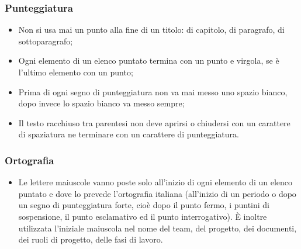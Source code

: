\subsubsection{Punteggiatura}
\begin{itemize}
\item Non si usa mai un punto alla fine di un titolo: di capitolo, di paragrafo, di sottoparagrafo;

\item Ogni elemento di un elenco puntato termina con un punto e virgola, se è l'ultimo elemento con un punto;

\item Prima di ogni segno di punteggiatura non va mai messo uno spazio bianco, dopo invece lo spazio bianco va messo sempre;

\item Il testo racchiuso tra parentesi non deve aprirsi o chiudersi con un carattere di spaziatura ne terminare con un carattere di punteggiatura.

\end{itemize}
\subsubsection{Ortografia}

\begin{itemize}

\item Le lettere maiuscole vanno poste solo all'inizio di ogni elemento di un elenco puntato e dove lo prevede l'ortografia italiana (all'inizio di un periodo o dopo un segno di punteggiatura forte, cioè dopo il punto fermo, i puntini di sospensione, il punto esclamativo ed il punto interrogativo). È inoltre utilizzata l'iniziale maiuscola nel nome del team, del progetto, dei documenti, dei ruoli di progetto, delle fasi di lavoro.


\end{itemize}

